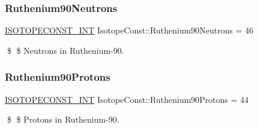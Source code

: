 \subsubsection{\texorpdfstring{Ruthenium90\+Neutrons}{Ruthenium90Neutrons}}
{\footnotesize\ttfamily \mbox{\hyperlink{group___isotope_const-_macros_ga5f18360b3e99483a35c32d789e62621c}{I\+S\+O\+T\+O\+P\+E\+C\+O\+N\+S\+T\+\_\+\+I\+NT}} Isotope\+Const\+::\+Ruthenium90\+Neutrons = 46}

\$ \$ Neutrons in Ruthenium-\/90. \mbox{\label{group___isotope_const-_ruthenium-_ru90_ga2f16f687cf2a2c9c95578e48dbc9a6a3}} 
\subsubsection{\texorpdfstring{Ruthenium90\+Protons}{Ruthenium90Protons}}
{\footnotesize\ttfamily \mbox{\hyperlink{group___isotope_const-_macros_ga5f18360b3e99483a35c32d789e62621c}{I\+S\+O\+T\+O\+P\+E\+C\+O\+N\+S\+T\+\_\+\+I\+NT}} Isotope\+Const\+::\+Ruthenium90\+Protons = 44}

\$ \$ Protons in Ruthenium-\/90. 
